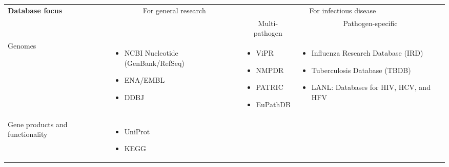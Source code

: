 \begin{table*}[ht]
  \centering
  \small
  \begin{tabular}{p{3.5cm} l l l}
    \toprule
    \textbf{Database focus} & \multicolumn{1}{c}{For general research} & \multicolumn{2}{c}{For infectious disease}\\
    \cline{3-4}
    & & \multicolumn{1}{c}{Multi-pathogen} & \multicolumn{1}{c}{Pathogen-specific} \\
    \midrule
    Genomes &
    \begin{minipage}[t]{3.5cm}
      \raggedright
      \begin{itemize}[noitemsep]
      \item NCBI Nucleotide (GenBank/RefSeq)
      \item ENA/EMBL
      \item DDBJ
      \end{itemize}
    \end{minipage} & 
    \begin{minipage}[t]{3.5cm}
      \raggedright
      \begin{itemize}[noitemsep]
      \item ViPR
      \item NMPDR
      \item PATRIC
      \item EuPathDB
      \end{itemize}
    \end{minipage} & 
    \begin{minipage}[t]{3.5cm}
      \raggedright
      \begin{itemize}[noitemsep]
      \item Influenza Research Database (IRD)
      \item Tuberculosis Database (TBDB)
      \item LANL: Databases for HIV, HCV, and HFV 
      \end{itemize}
    \end{minipage}
    \\
    Gene products and functionality &
    \begin{minipage}[t]{3.5cm}
      \raggedright
      \begin{itemize}[noitemsep]
      \item UniProt
      \item KEGG
      \end{itemize}
    \end{minipage} &
    \begin{minipage}[t]{3.5cm}

\end{minipage}
\end{tabular}
\end{table*}
